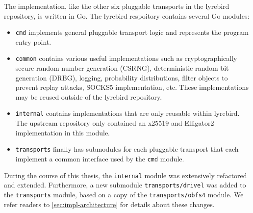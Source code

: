 The \drivel{} implementation, like the other six pluggable transports in the lyrebird repository, is written in Go. The lyrebird respoitory contains several Go modules:
\begin{itemize}
    \item \texttt{cmd} implements general pluggable transport logic and represents the program entry point.
    
    \item \texttt{common} contains various useful implementations such as cryptographically secure random number generation (CSRNG), deterministic random bit generation (DRBG), logging, probability distributions, filter objects to prevent replay attacks, SOCKS5 implementation, etc. These implementations may be reused outside of the lyrebird repository. 
    
    \item \texttt{internal} contains implementations that are only reusable within lyrebird. The upstream repository only contained an x25519 and \textsf{Elligator2}~\cite{CCS:BHKL13} implementation in this module.
    
    \item \texttt{transports} finally has submodules for each pluggable transport that each implement a common interface used by the \texttt{cmd} module. 
\end{itemize}

During the course of this thesis, the \texttt{internal} module was extensively refactored and extended. Furthermore, a new submodule \texttt{transports/drivel} was added to the \texttt{transports} module, based on a copy of the \texttt{transports/obfs4} module. We refer readers to \cref{sec:impl-architecture} for details about these changes.

